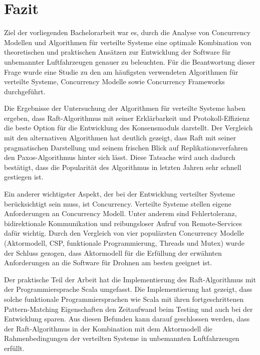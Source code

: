 \chapter{Fazit}
\label{cha:Fazit}

Ziel der vorliegenden Bachelorarbeit war es, durch die Analyse von Concurrency Modellen und Algorithmen für verteilte Systeme eine optimale Kombination von theoretischen und praktischen Ansätzen zur Entwicklung der Software für unbemannter Luftfahrzeugen genauer zu beleuchten. Für die Beantwortung dieser Frage wurde eine Studie zu den am häufigsten verwendeten Algorithmen für verteilte Systeme, Concurrency Modelle sowie Concurrency Frameworks durchgeführt.

Die Ergebnisse der Untersuchung der Algorithmen für verteilte Systeme haben ergeben, dass Raft-Algorithmus mit seiner Erklärbarkeit und Protokoll-Effizienz die beste Option für die Entwicklung des Konsensmoduls darstellt. Der Vergleich mit den alternativen Algorithmen hat deutlich gezeigt, dass Raft mit seiner pragmatischen Darstellung und seinem frischen Blick auf Replikationsverfahren den Paxos-Algorithmus hinter sich lässt. Diese Tatsache wird auch dadurch bestätigt, dass die Popularität des Algorithmus in letzten Jahren sehr schnell gestiegen ist.

Ein anderer wichtigster Aspekt, der bei der Entwicklung verteilter Systeme berücksichtigt sein muss, ist Concurrency. Verteilte Systeme stellen eigene Anforderungen an Concurrency Modell. Unter anderem sind Fehlertoleranz, bidirektionale Kommunikation und reibungsloser Aufruf von Remote-Services dafür wichtig. Durch den Vergleich von vier populärsten Concurrency Modelle (Aktormodell, CSP, funktionale Programmierung, Threads und Mutex) wurde der Schluss gezogen, dass Aktormodell für die Erfüllung der erwähnten Anforderungen an die Software für Drohnen am besten geeignet ist. 

Der praktische Teil der Arbeit hat die Implementierung des Raft-Algorithmus mit der Programmiersprache Scala umgefasst. Die Implementierung hat gezeigt, dass solche funktionale Programmiersprachen wie Scala mit ihren fortgeschrittenen Pattern-Matching Eigenschaften den Zeitaufwand beim Testing und auch bei der Entwicklung sparen. Aus diesen Befunden kann darauf geschlossen werden, dass der Raft-Algorithmus in der Kombination mit dem Aktormodell die Rahmenbedingungen der verteilten Systeme in unbemannten Luftfahrzeugen erfüllt. 
